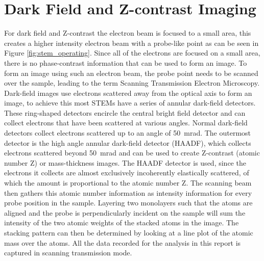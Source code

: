 \section{Dark Field and Z-contrast Imaging}
For dark field and Z-contrast the electron beam is focused to a small area, this creates a higher intensity electron beam with a probe-like point as can be seen in Figure \ref{fig:stem_operating}. Since all of the electrons are focused on a small area, there is no phase-contrast information that can be used to form an image. To form an image using such an electron beam, the probe point needs to be scanned over the sample, leading to the term Scanning Transmission Electron Microscopy.
Dark-field images use electrons scattered away from the optical axis to form an image, to achieve this most STEMs have a series of annular dark-field detectors.
These ring-shaped detectors encircle the central bright field detector and can collect electrons that have been scattered at various angles. Normal dark-field detectors collect electrons scattered up to an angle of \SI{50}{\milli \radian}. The outermost detector is the high angle annular dark-field detector (HAADF), which collects electrons scattered beyond \SI{50}{\milli \radian} and can be used to create Z-contrast (atomic number Z) or mass-thickness images.
The HAADF detector is used, since the electrons it collects are almost exclusively incoherently elastically scattered, of which the amount is proportional to the atomic number Z.
The scanning beam then gathers this atomic number information as intensity information for every probe position in the sample.
Layering two monolayers such that the atoms are aligned and the probe is perpendicularly incident on the sample will sum the intensity of the two atomic weights of the stacked atoms in the image. The stacking pattern can then be determined by looking at a line plot of the atomic mass over the atoms. All the data recorded for the analysis in this report is captured in scanning transmission mode.





